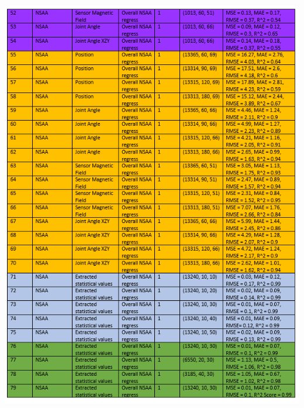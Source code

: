 \documentclass[12pt,twoside]{report}
\begin{document}
\begin{center}
\includegraphics[scale=1]{project_figures/fig10_5}
\end{center}
\end{document}
